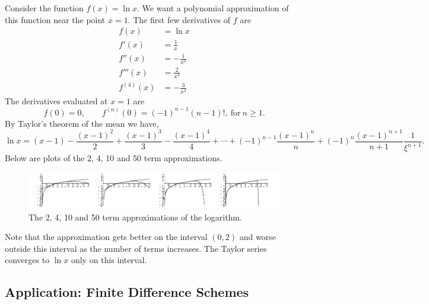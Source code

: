 \begin{Example}
  Consider the function $f(x) = \ln x$.  We want a polynomial approximation of
  this function near the point $x = 1$. The first few derivatives of $f$ are
  \begin{align*}
    f(x) &= \ln x \\
    f'(x) &= \frac{1}{x} \\
    f''(x) &= - \frac{1}{x^2} \\
    f'''(x) &= \frac{2}{x^3} \\
    f^{(4)}(x) &= - \frac{3}{x^4}
  \end{align*}
  The derivatives evaluated at $x = 1$ are
  \[
  f(0) = 0, \qquad f^{(n)}(0) = (-1)^{n-1} (n-1)!,\ \mathrm{for}\ n \geq 1.
  \]
  By Taylor's theorem of the mean we have,
  \[
  \ln x = (x-1) - \frac{(x-1)^2}{2} + \frac{(x-1)^3}{3} - \frac{(x-1)^4}{4}
  + \cdots + (-1)^{n-1} \frac{(x-1)^n}{n} 
  + (-1)^n \frac{(x-1)^{n+1}}{n+1} \frac{1}{\xi^{n+1}}.
  \]
  Below are plots of the 2, 4, 10 and 50 term approximations.  

  \begin{figure}[h!]
    \begin{center}
      \includegraphics[width=\textwidth]{calculus/differential/taylnt4}
    \end{center}
    \caption{The 2, 4, 10 and 50 term approximations of the logarithm.}
    \label{taylnt4}
  \end{figure}

  Note that the 
  approximation gets better on the interval $(0,2)$ and worse outside this
  interval as the number of terms increases.  The Taylor series converges to
  $\ln x$ only on this interval.
\end{Example}






\subsection{Application: Finite Difference Schemes}



